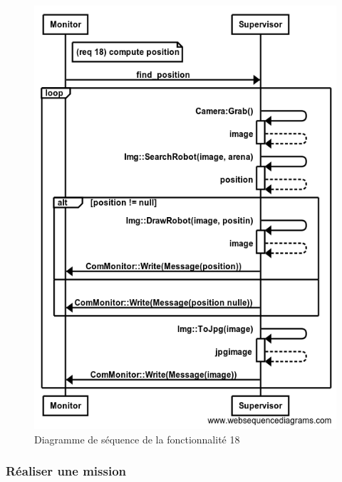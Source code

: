  \begin{figure}[htbp]
\begin{center}
\includegraphics[scale=0.4]{./seq_req/req18}
\caption{Diagramme de séquence de la fonctionnalité 18}
\label{fig:diag17}
\end{center}
\end{figure}
\FloatBarrier
 
\subsubsection{Réaliser une mission}

